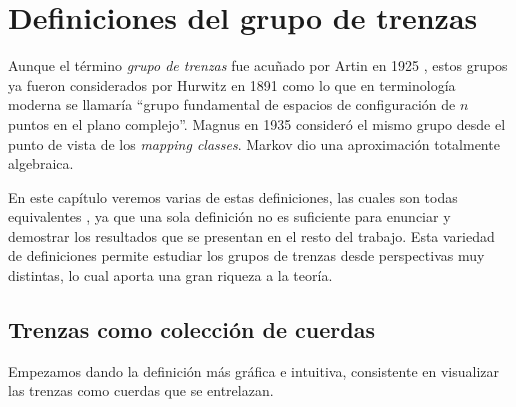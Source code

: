 \documentclass[TFG.tex]{subfiles}
\begin{document}
\chapter{Definiciones del grupo de trenzas}




Aunque el término \emph{grupo de trenzas} fue acuñado por Artin en 1925 \cite{ArtinA}, estos grupos ya fueron considerados por Hurwitz en 1891 \cite{Hur} como lo que en terminología moderna se llamaría ``grupo fundamental de espacios de configuración de $n$ puntos en el plano complejo''. Magnus en 1935 \cite{Magnus} consideró el mismo grupo desde el punto de vista de los \emph{mapping classes}. Markov \cite{Markoff} dio una aproximación totalmente algebraica. 

En este capítulo veremos varias de estas definiciones, las cuales son todas equivalentes \cite{Zariski}, ya que una sola definición no es suficiente para enunciar y demostrar los resultados que se presentan en el resto del trabajo. Esta variedad de definiciones permite estudiar los grupos de trenzas desde perspectivas muy distintas, lo cual aporta una gran riqueza a la teoría.

\section{Trenzas como colección de cuerdas}
Empezamos dando la definición más gráfica e intuitiva, consistente en visualizar las trenzas como cuerdas que se entrelazan. 
\end{document}
